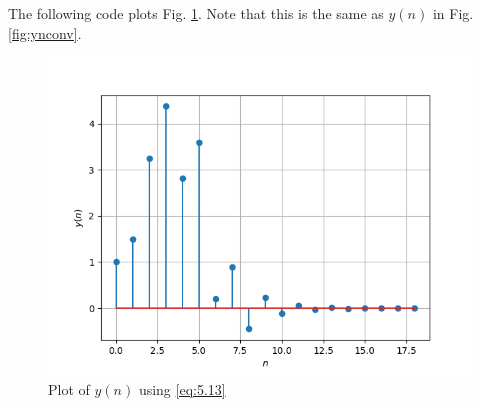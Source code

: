 \documentclass[journal,12pt,twocolumn]{IEEEtran}
\theoremstyle{remark}
\renewcommand\thesection{\arabic{section}}
\numberwithin{equation}{subsection}
\begin{document}
\begin{enumerate}[label=\thesection.\arabic*]
The following code plots Fig. \ref{fig:5.6}. Note that this is the same as 
$y(n)$ in  Fig. 
\ref{fig:ynconv}.
\begin{figure}[!h]
    \centering
    \includegraphics[width = \columnwidth]{figs/5.6.png}
    \caption{Plot of $y(n)$ using \eqref{eq:5.13}}
    \label{fig:5.6}
\end{figure}
\end{enumerate}
\end{document}

